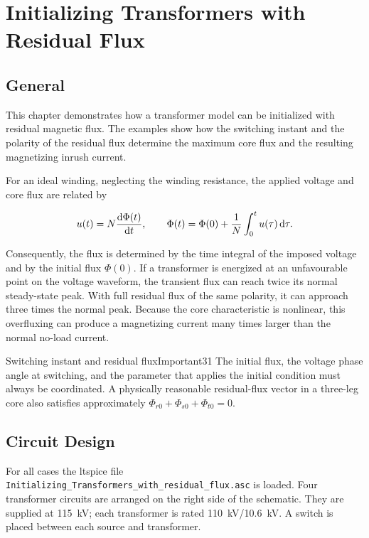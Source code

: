 \chapter{Initializing Transformers with Residual Flux}
\label{chap:chapter3}

\section{General}
\label{sec:section31}
This chapter demonstrates how a transformer model can be initialized with
residual magnetic flux. The examples show how the switching instant and the
polarity of the residual flux determine the maximum core flux and the resulting
magnetizing inrush current.

For an ideal winding, neglecting the winding resistance, the applied voltage
and core flux are related by

\begin{equation}
u(t)=N\frac{\mathop{}\!\mathrm{d}\Phi(t)}{\mathop{}\!\mathrm{d} t},
\qquad
\Phi(t)=\Phi(0)+\frac{1}{N}\int_0^t u(\tau)\mathop{}\!\mathrm{d}\tau.
\label{eq:flux-voltage-integral}
\end{equation}

Consequently, the flux is determined by the time integral of the imposed
voltage and by the initial flux $\Phi(0)$. If a transformer is energized at an
unfavourable point on the voltage waveform, the transient flux can reach twice
its normal steady-state peak. With full residual flux of the same polarity, it
can approach three times the normal peak. Because the core characteristic is
nonlinear, this overfluxing can produce a magnetizing current many times larger
than the normal no-load current.

\begin{important}{Switching instant and residual flux}{Important31}
The initial flux, the voltage phase angle at switching, and the parameter that
applies the initial condition must always be coordinated. A physically
reasonable residual-flux vector in a three-leg core also satisfies approximately
$\Phi_{r0}+\Phi_{s0}+\Phi_{t0}=0$.
\end{important}

\section{Circuit Design}
\label{sec:section32}
For all cases the ltspice file \texttt{Initializing\_Transformers\_with\_residual\_flux.asc} is loaded. 
Four transformer circuits are arranged on the right side of the schematic.
They are supplied at \SI{115}{\kilo\volt}; each transformer is rated
\SI{110}{\kilo\volt}/\SI{10.6}{\kilo\volt}. A switch is placed between each
source and transformer.

